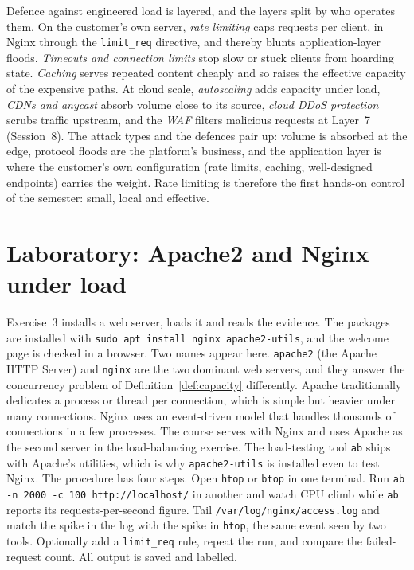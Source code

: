 Defence against engineered load is layered, and the layers split by who
operates them. On the customer's own server, \emph{rate limiting} caps requests per
client, in Nginx through the \texttt{limit\_req} directive, and thereby
blunts application-layer floods. \emph{Timeouts and connection limits} stop
slow or stuck clients from hoarding state. \emph{Caching} serves repeated
content cheaply and so raises the effective capacity of the expensive
paths. At cloud scale, \emph{autoscaling} adds capacity under
load, \emph{CDNs and anycast} absorb volume close to its source, \emph{cloud
DDoS protection} scrubs traffic upstream, and the \emph{WAF} filters
malicious requests at Layer~7 (Session~8). The attack types and the defences
pair up: volume is absorbed at the edge, protocol floods are the platform's
business, and the application layer is where the customer's own
configuration (rate limits, caching, well-designed endpoints) carries the
weight. Rate limiting is therefore the first hands-on control of the
semester: small, local and effective.

\section{Laboratory: Apache2 and Nginx under load}

Exercise~3 installs a web server, loads it and reads the evidence. The
packages are installed with \texttt{sudo apt install nginx apache2-utils},
and the welcome page is checked in a browser. Two names appear here.
\texttt{apache2} (the Apache HTTP Server) and \texttt{nginx} are the two
dominant web servers, and they answer the concurrency problem of
Definition~\ref{def:capacity} differently. Apache traditionally dedicates a
process or thread per connection, which is simple but heavier under many
connections. Nginx uses an event-driven model that handles thousands of
connections in a few processes. The course serves with Nginx and uses
Apache as the second server in the load-balancing exercise. The load-testing
tool \texttt{ab} ships with Apache's utilities, which is why
\texttt{apache2-utils} is installed even to test Nginx. The procedure has
four steps. Open \texttt{htop} or \texttt{btop} in one terminal. Run
\texttt{ab -n 2000 -c 100 http://localhost/} in another and watch CPU climb
while \texttt{ab} reports its requests-per-second figure. Tail
\texttt{/var/log/nginx/access.log} and match the spike in the log with the
spike in \texttt{htop}, the same event seen by two tools. Optionally add a
\texttt{limit\_req} rule, repeat the run, and compare the failed-request
count. All output is saved and labelled.

